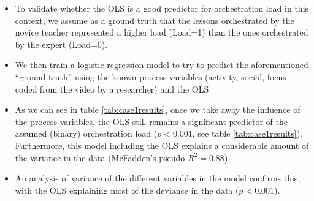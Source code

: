 \documentclass[10pt,journal,compsoc]{IEEEtran}
\begin{document}
\begin{itemize}
\item To validate whether the OLS is a good predictor for orchestration load in this context, we assume as a ground truth that the lessons orchestrated by the novice teacher represented a higher load (Load=1) than the ones orchestrated by the expert (Load=0). 
\item We then train a logistic regression model to try to predict the aforementioned ``ground truth'' using the known process variables (activity, social, focus -- coded from the video by a researcher) and the OLS
\item As we can see in table \ref{tab:case1results}, once we take away the influence of the process variables, the OLS still remains a significant predictor of the assumed (binary) orchestration load ($p<0.001$, see table \ref{tab:case1results}). Furthermore, this model including the OLS explains a considerable amount of the variance in the data (McFadden's pseudo-$R^2=0.88$) 
\item An analysis of variance of the different variables in the model confirms this, with the OLS explaining most of the deviance in the data ($p<0.001$). 
\end{itemize}
\end{document}
